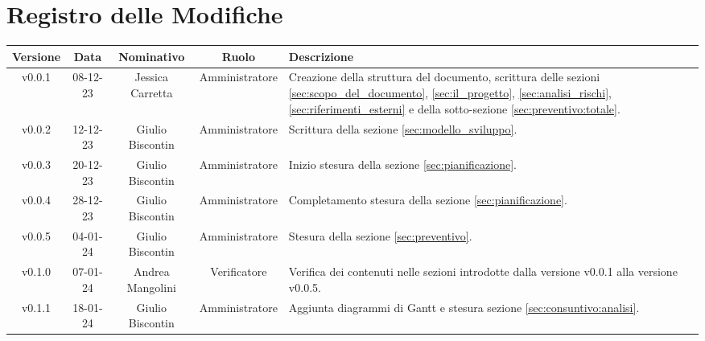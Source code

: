\section*{\Large Registro delle Modifiche}
    \begin{table}[h]
        \centering
        \renewcommand\tabularxcolumn[1]{m{#1}} %
        \renewcommand{\arraystretch}{1.5}
        \begin{tabularx}{0.98\textwidth}
            {c|c|c|c|>{\centering\arraybackslash}X}
            \rowcolor{black}
            \textbf{\color{white} Versione} & \textbf{\color{white} Data} & \textbf{\color{white} Nominativo} & \textbf{\color{white} Ruolo} & \textbf{\color{white} Descrizione} \\ 
            \hline

            v0.0.1 & 08-12-23 & Jessica Carretta & Amministratore & Creazione della struttura del documento, scrittura delle sezioni \ref{sec:scopo_del_documento}, \ref{sec:il_progetto}, \ref{sec:analisi_rischi}, \ref{sec:riferimenti_esterni} e della sotto-sezione \ref{sec:preventivo:totale}. \\
            
            v0.0.2 & 12-12-23 & Giulio Biscontin & Amministratore & Scrittura della sezione \ref{sec:modello_sviluppo}. \\
            
            v0.0.3 & 20-12-23 & Giulio Biscontin & Amministratore & Inizio stesura della sezione \ref{sec:pianificazione}. \\
            
            v0.0.4 & 28-12-23 & Giulio Biscontin & Amministratore & Completamento stesura della sezione \ref{sec:pianificazione}. \\
            
            v0.0.5 & 04-01-24 & Giulio Biscontin & Amministratore & Stesura della sezione \ref{sec:preventivo}. \\

            v0.1.0 & 07-01-24 & Andrea Mangolini & Verificatore & Verifica dei contenuti nelle sezioni introdotte dalla versione v0.0.1 alla versione v0.0.5. \\

            v0.1.1 & 18-01-24 & Giulio Biscontin & Amministratore & Aggiunta diagrammi di Gantt e stesura sezione \ref{sec:consuntivo:analisi}. \\


\end{tabularx}
\end{table}
